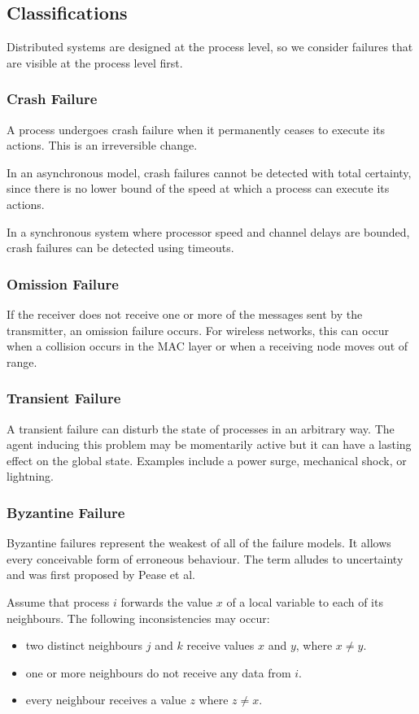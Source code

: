 \subsection{Classifications}
Distributed systems are designed at the process level, so we consider failures that are visible at the process level first.

\subsubsection{Crash Failure}
A process undergoes crash failure when it permanently ceases to execute its actions. This is an irreversible change.

In an asynchronous model, crash failures cannot be detected with total certainty, since there is no lower bound of the speed at which a process can execute its actions. 

In a synchronous system where processor speed and channel delays are bounded, crash failures can be detected using timeouts. 

\subsubsection{Omission Failure}

If the receiver does not receive one or more of the messages sent by the transmitter, an omission failure occurs. For wireless networks, this can occur when a collision occurs in the MAC layer or when a receiving node moves out of range.

\subsubsection{Transient Failure}

A transient failure can disturb the state of processes in an arbitrary way. The agent inducing this problem may be momentarily active but it can have a lasting effect on the global state. Examples include a power surge, mechanical shock, or lightning.

\subsubsection{Byzantine Failure}

Byzantine failures represent the weakest of all of the failure models. It allows every conceivable form of erroneous behaviour. The term alludes to uncertainty and was first proposed by Pease et al.

Assume that process $i$ forwards the value $x$ of a local variable to each of its neighbours. The following inconsistencies may occur: \begin{itemize}
\item two distinct neighbours $j$ and $k$ receive values $x$ and $y$, where $x \neq y$.
\item one or more neighbours do not receive any data from $i$.
\item every neighbour receives a value $z$ where $z \neq x$.
\end{itemize}

